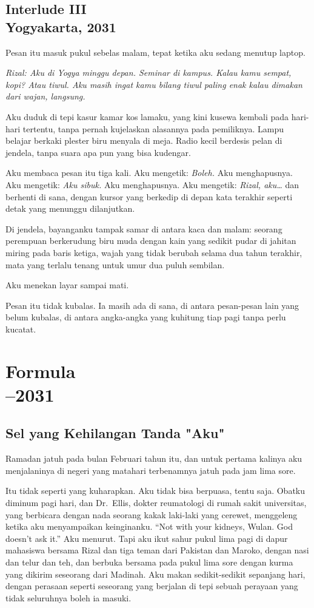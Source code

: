 \documentclass[11pt,twoside,openany]{book}
\begin{document}
\chapter*{Interlude III\\[0.5em]\normalsize\upshape Yogyakarta, 2031}
Pesan itu masuk pukul sebelas malam, tepat ketika aku sedang menutup laptop.

\emph{Rizal: Aku di Yogya minggu depan. Seminar di kampus. Kalau kamu sempat, kopi? Atau tiwul. Aku masih ingat kamu bilang tiwul paling enak kalau dimakan dari wajan, langsung.}

Aku duduk di tepi kasur kamar kos lamaku, yang kini kusewa kembali pada hari-hari tertentu, tanpa pernah kujelaskan alasannya pada pemiliknya. Lampu belajar berkaki plester biru menyala di meja. Radio kecil berdesis pelan di jendela, tanpa suara apa pun yang bisa kudengar.

Aku membaca pesan itu tiga kali. Aku mengetik: \emph{Boleh.} Aku menghapusnya. Aku mengetik: \emph{Aku sibuk.} Aku menghapusnya. Aku mengetik: \emph{Rizal, aku\ldots{}} dan berhenti di sana, dengan kursor yang berkedip di depan kata terakhir seperti detak yang menunggu dilanjutkan.

Di jendela, bayanganku tampak samar di antara kaca dan malam: seorang perempuan berkerudung biru muda dengan kain yang sedikit pudar di jahitan miring pada baris ketiga, wajah yang tidak berubah selama dua tahun terakhir, mata yang terlalu tenang untuk umur dua puluh sembilan.

Aku menekan layar sampai mati.

Pesan itu tidak kubalas. Ia masih ada di sana, di antara pesan-pesan lain yang belum kubalas, di antara angka-angka yang kuhitung tiap pagi tanpa perlu kucatat.

\part[Formula]{Formula\\[0.7em]\normalsize{}--2031}
\chapter{Sel yang Kehilangan Tanda "Aku"}
Ramadan jatuh pada bulan Februari tahun itu, dan untuk pertama kalinya aku menjalaninya di negeri yang matahari terbenamnya jatuh pada jam lima sore.

Itu tidak seperti yang kuharapkan. Aku tidak bisa berpuasa, tentu saja. Obatku diminum pagi hari, dan Dr.~Ellis, dokter reumatologi di rumah sakit universitas, yang berbicara dengan nada seorang kakak laki-laki yang cerewet, menggeleng ketika aku menyampaikan keinginanku. ``Not with your kidneys, Wulan. God doesn't ask it.'' Aku menurut. Tapi aku ikut sahur pukul lima pagi di dapur mahasiswa bersama Rizal dan tiga teman dari Pakistan dan Maroko, dengan nasi dan telur dan teh, dan berbuka bersama pada pukul lima sore dengan kurma yang dikirim seseorang dari Madinah. Aku makan sedikit-sedikit sepanjang hari, dengan perasaan seperti seseorang yang berjalan di tepi sebuah perayaan yang tidak seluruhnya boleh ia masuki.
\end{document}
